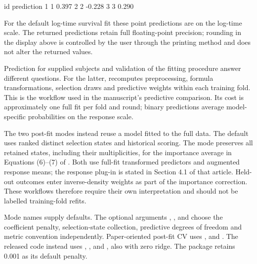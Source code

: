 \documentclass[article]{jss}
\begin{document}
\begin{CodeChunk}
\begin{CodeOutput}
  id prediction
1  1      0.397
2  2     -0.228
3  3      0.290
\end{CodeOutput}
\end{CodeChunk}

For the default log-time survival fit these point predictions are on the log-time
scale. The returned predictions retain full floating-point precision; rounding in the
display above is controlled by the user through the printing method and does
not alter the returned values.

Prediction for supplied subjects and validation of the fitting procedure answer
different questions. For the latter, 
recomputes preprocessing, formula transformations, selection draws and
predictive weights within each training fold. This is the workflow used in
the manuscript's predictive comparison. Its cost is approximately one full fit
per fold and round; binary predictions average model-specific probabilities
on the response scale.

The two post-fit modes instead reuse a model fitted to the full data. The
default  uses ranked distinct selection states
and historical scoring. The  mode preserves all retained
states, including their multiplicities, for the importance average in
Equations (6)--(7) of \citet{chekouo2017}. Both use full-fit transformed
predictors and augmented response means; the response plug-in is stated in
Section 4.1 of that article. Held-out outcomes enter inverse-density weights
as part of the importance correction. These workflows therefore require their
own interpretation and should not be labelled training-fold refits.

Mode names supply defaults. The optional arguments ,
,  and  choose the
coefficient penalty, selection-state collection, predictive degrees of freedom
and metric convention independently. Paper-oriented post-fit CV uses
,  and
. The released code instead uses
, ,
 and ,
also with zero ridge. The package retains 0.001 as its default penalty.
\end{document}
